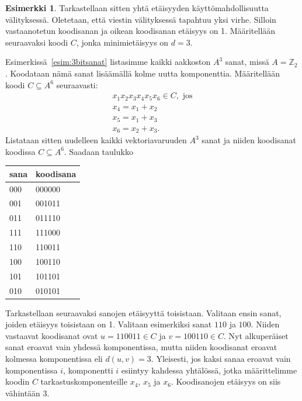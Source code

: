 \documentclass[a4paper,12pt,leqno,oneside]{report} %
\theoremstyle{plain}
\theoremstyle{plain}
\theoremstyle{definition}
\newtheorem{esimerkki}{Esimerkki}[chapter]
\theoremstyle{remark}
\numberwithin{equation}{chapter}
\newcommand*{\Zset}{\mathbb{Z}}  %
\begin{document}
    \begin{esimerkki}\label{esim:minetaisyys}
        Tarkastellaan sitten yhtä etäisyyden käyttömahdollisuutta välityksessä. Oletetaan, että viestin välityksessä tapahtuu yksi virhe. Silloin vastaanotetun koodisanan ja oikean koodisanan etäisyys on 1. Määritellään seuraavaksi koodi $C$, jonka minimietäisyys on $d = 3$.

        Esimerkissä~\ref{esim:3bitsanat} listasimme kaikki aakkoston $A^3$ sanat, missä $A = \Zset_2$. Koodataan nämä sanat lisäämällä kolme uutta komponenttia. Määritellään koodi $C \subseteq A^6$ seuraavasti:
        \begin{gather*}
            x_1x_2x_3x_4x_5x_6 \in C, \text{ jos} \\
            x_4 = x_1 + x_2 \\
            x_5 = x_1 + x_3 \\
            x_6 = x_2 + x_3.
        \end{gather*}
        Listataan sitten uudelleen kaikki vektoriavaruuden $A^3$ sanat ja niiden koodisanat koodissa $C \subseteq A^6$. Saadaan taulukko
        \begin{center}
            \begin{tabular}[t]{ll}
                sana & koodisana \\ \midrule
                000 & 000000\\
                001 & 001011\\
                011 & 011110\\
                111 & 111000\\
                110 & 110011\\
                100 & 100110\\
                101 & 101101\\
                010 & 010101\\
            \end{tabular}
        \end{center}
        
        Tarkastellaan seuraavaksi sanojen etäisyyttä toisistaan. Valitaan ensin sanat, joiden etäisyys toisistaan on 1. Valitaan esimerkiksi sanat $110$ ja $100$. Niiden vastaavat koodisanat ovat $u = 110011 \in C$ ja $v = 100110 \in C$. Nyt alkuperäiset sanat eroavat vain yhdessä komponentissa, mutta niiden koodisanat eroavat kolmessa komponentissa eli $d(u,v) = 3$. Yleisesti, jos kaksi sanaa eroavat vain komponentissa $i$, komponentti $i$ esiintyy kahdessa yhtälössä, jotka määrittelimme koodin $C$ tarkastuskomponenteille
        $x_4$, $x_5$ ja $x_6$. Koodisanojen etäisyys on siis vähintään 3.


\end{esimerkki}
\end{document}
